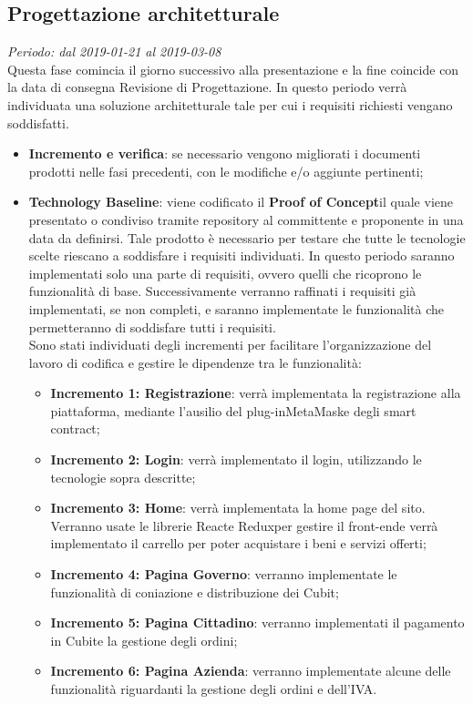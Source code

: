 \subsection{Progettazione architetturale}
\textit{Periodo: dal 2019-01-21 al 2019-03-08} \\
Questa fase comincia il giorno successivo alla presentazione e la fine coincide con la data di consegna Revisione di 
Progettazione. In questo periodo verrà individuata una soluzione architetturale 
tale per cui i requisiti richiesti vengano soddisfatti.
\begin{itemize}
	\item \textbf{Incremento e verifica}: se necessario vengono migliorati i documenti prodotti nelle fasi precedenti, con le modifiche e/o aggiunte pertinenti;
	\item \textbf{Technology Baseline}: %
	viene codificato il \textbf{Proof of Concept}\glosp il quale viene presentato o condiviso tramite repository al committente e proponente in una data da definirsi. Tale prodotto è necessario per testare che tutte le tecnologie scelte riescano a soddisfare i requisiti individuati. In questo periodo saranno implementati solo una parte di requisiti, ovvero quelli che ricoprono le funzionalità di base. Successivamente verranno raffinati i requisiti già implementati, se non completi, e saranno implementate le funzionalità che permetteranno di soddisfare tutti i requisiti. \\
	Sono stati individuati degli incrementi per facilitare l'organizzazione del lavoro di codifica e gestire le dipendenze tra le funzionalità:
	\begin{itemize}
		\item \textbf{Incremento 1: Registrazione}: verrà implementata la registrazione alla piattaforma, mediante l'ausilio del plug-in\glosp MetaMask\glosp e degli smart contract\glo;
		\item \textbf{Incremento 2: Login}: verrà implementato il login, utilizzando le tecnologie sopra descritte;
		\item \textbf{Incremento 3: Home}: verrà implementata la home page del sito. Verranno usate le librerie React\glosp e Redux\glosp per gestire il front-end\glosp e verrà implementato il carrello per poter acquistare i beni e servizi offerti;
		\item \textbf{Incremento 4: Pagina Governo}: verranno implementate le funzionalità di coniazione e distribuzione dei Cubit\glo;
		\item \textbf{Incremento 5: Pagina Cittadino}: verranno implementati il pagamento in Cubit\glosp e la gestione degli ordini;
		\item \textbf{Incremento 6: Pagina Azienda}: verranno implementate alcune delle funzionalità riguardanti la gestione degli ordini e dell'IVA.
	\end{itemize}

\end{itemize}

